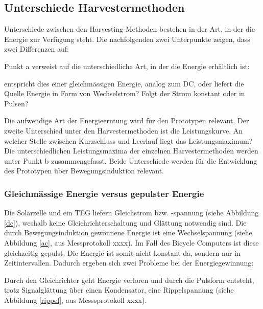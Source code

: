 \subsection{Unterschiede Harvestermethoden}\label{harv_diff} 


Unterschiede zwischen den Harvesting-Methoden bestehen in der Art, in der die Energie zur Verfügung steht. Die nachfolgenden zwei Unterpunkte zeigen, dass zwei Differenzen auf: 

Punkt a verweist auf die unterschiedliche Art, in der die Energie erhältlich ist:

entspricht dies einer gleichmässigen Energie, analog zum DC, oder liefert die Quelle Energie in Form von Wechselstrom? Folgt der Strom konstant oder in Pulsen?

Die aufwendige Art  der Energieerntung wird für den Prototypen relevant.  Der zweite Unterschied unter den Harvestermethoden ist die Leistungskurve. An welcher Stelle zwischen Kurzschluss  und Leerlauf liegt das Leistungsmaximum? Die unterschiedlichen Leistungsmaxima der einzelnen Harvestermethoden werden unter Punkt b zusammengefasst. Beide Unterschiede werden für die Entwicklung des Prototypen über Bewegungsinduktion relevant.

\subsubsection{Gleichmässige Energie versus gepulster Energie}


Die Solarzelle und ein TEG liefern Gleichstrom bzw. -spannung (siehe Abbildung \ref{dc}), weshalb keine Gleichrichterschaltung und Glättung notwendig sind. Die durch Bewegungsinduktion gewonnene Energie ist eine Wechselspannung (siehe Abbildung \ref{ac}, aus Messprotokoll  xxxx). Im Fall des Bicycle Computers ist diese gleichzeitig gepulst.  Die Energie ist somit nicht konstant da, sondern nur in Zeitintervallen. Dadurch ergeben sich zwei Probleme bei der Energiegewinnung: 

Durch den Gleichrichter geht Energie verloren und durch die Pulsform entsteht, trotz Signalglättung über einen Kondensator, eine Rippelspannung (siehe Abbildung \ref{rippel}, aus Messsprotokoll xxxx). 

